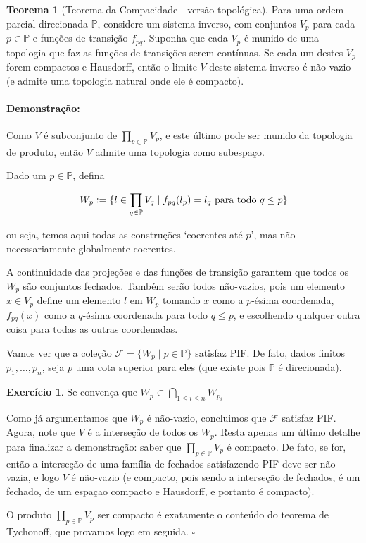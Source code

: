 \documentclass[11pt]{article}
\newcommand{\defeq}{\vcentcolon=}
\newcommand{\pulinho}{\vspace{.5cm}}
\newcommand{\luafacil}{
\emoji{waxing-crescent-moon}
}
\theoremstyle{definition}
\newtheorem{theorem}{Teorema}
\newenvironment{teorema}{
\definecolor{shadecolor}{HTML}{f59aa3}
\begin{shaded}
\begin{theorem}
}
{
\end{theorem}
\end{shaded}
}
\theoremstyle{definition}
\theoremstyle{definition}
\theoremstyle{definition}
\theoremstyle{definition}
\theoremstyle{definition}
\theoremstyle{definition}
\theoremstyle{definition}
\theoremstyle{definition}
\theoremstyle{definition}
\theoremstyle{definition}
\theoremstyle{definition}
\newenvironment{prova}{\paragraph{Demonstração:}}{\hfill$\square$ 
\pulinho
}
\theoremstyle{definition}
\newtheorem{exersisio}{Exercício}
\newenvironment{exercicio}{
\definecolor{shadecolor}{HTML}{CFB5FF}
\begin{shaded}
\begin{exersisio}
}
{
\end{exersisio}
\end{shaded}
}
\begin{document}
\begin{teorema}[Teorema da Compacidade - versão topológica]
Para uma ordem parcial direcionada $\mathbb{P}$, considere um sistema inverso, com conjuntos $V_p$ para cada $p \in \mathbb{P}$ e funções de transição $f_{pq}$. Suponha que cada $V_p$ é munido de uma topologia que faz as funções de transições serem contínuas. Se cada um destes $V_p$ forem compactos e Hausdorff, então o limite $V$ deste sistema inverso é não-vazio (e admite uma topologia natural onde ele é compacto).
\end{teorema}
\begin{prova}
Como $V$ é subconjunto de $\prod_{p \in \mathbb{P}} V_p$, e este último pode ser munido da topologia de produto, então $V$ admite uma topologia como subespaço.

Dado um $p \in \mathbb{P}$, defina 

\[ W_p \defeq \{l \in \prod_{q \in \mathbb{P}} V_q \mid f_{pq}(l_p) = l_q \text{ para todo } q \leq p \}\]

ou seja, temos aqui todas as construções `coerentes até $p$', mas não necessariamente globalmente coerentes.

A continuidade das projeções e das funções de transição garantem que todos os $W_p$ são conjuntos fechados. Também serão todos não-vazios, pois um elemento $x \in V_p$ define um elemento $l$ em $W_p$ tomando $x$ como a $p$-ésima coordenada, $f_{pq}(x)$ como a $q$-ésima coordenada para todo $q \leq p$, e escolhendo qualquer outra coisa para todas as outras coordenadas.

Vamos ver que a coleção $\mathcal{F} = \{W_p \mid p \in \mathbb{P}\}$ satisfaz PIF. De fato, dados finitos $p_1, \dots, p_n$, seja $p$ uma cota superior para eles (que existe pois $\mathbb{P}$ é direcionada). \begin{exercicio}
  \luafacil Se convença que $W_p \subset \bigcap_{1 \leq i \leq n} W_{p_i}$
\end{exercicio}

Como já argumentamos que $W_p$ é não-vazio, concluimos que $\mathcal{F}$ satisfaz PIF. Agora, note que $V$ é a interseção de todos os $W_p$. Resta apenas um último detalhe para finalizar a demonstração: saber que $\prod_{p \in \mathbb{P}} V_p$ é compacto. De fato, se for, então a interseção de uma família de fechados satisfazendo PIF deve ser não-vazia, e logo $V$ é não-vazio (e compacto, pois sendo a interseção de fechados, é um fechado, de um espaçao compacto e Hausdorff, e portanto é compacto).

O produto $\prod_{p \in \mathbb{P}} V_p$ ser compacto é exatamente o conteúdo do teorema de Tychonoff, que provamos logo em seguida. 
\end{prova}
\end{document}

